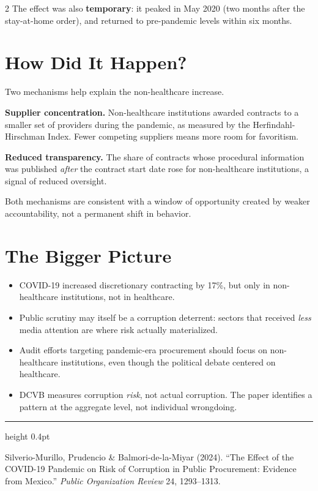 \documentclass[9pt]{article}
\begin{document}
\begin{multicols}{2}
The effect was also \textbf{temporary}: it peaked in May 2020
(two months after the stay-at-home order), and returned to pre-pandemic
levels within six months.

\section{How Did It Happen?}

Two mechanisms help explain the non-healthcare increase.

\textbf{Supplier concentration.} Non-healthcare institutions awarded
contracts to a smaller set of providers during the pandemic, as
measured by the Herfindahl-Hirschman Index. Fewer competing suppliers
means more room for favoritism.

\textbf{Reduced transparency.} The share of contracts whose procedural
information was published \textit{after} the contract start date rose
for non-healthcare institutions, a signal of reduced oversight.

Both mechanisms are consistent with a window of opportunity created
by weaker accountability, not a permanent shift in behavior.

\section{The Bigger Picture}

\begin{itemize}
  \item COVID-19 increased discretionary contracting by 17\%, but only
        in non-healthcare institutions, not in healthcare.
  \item Public scrutiny may itself be a corruption deterrent:
        sectors that received \textit{less} media attention are where
        risk actually materialized.
  \item Audit efforts targeting pandemic-era procurement should focus
        on non-healthcare institutions, even though the political
        debate centered on healthcare.
  \item DCVB measures corruption \textit{risk}, not actual corruption.
        The paper identifies a pattern at the aggregate level, not
        individual wrongdoing.
\end{itemize}

\end{multicols}

\vspace{0.2em}
{\color{navyblue}\hrule height 0.4pt}
\vspace{0.2em}
{\small\color{medgray}\centering
  Silverio-Murillo, Prudencio \& Balmori-de-la-Miyar (2024).
  ``The Effect of the COVID-19 Pandemic on Risk of Corruption in Public Procurement: Evidence from Mexico.''
  \textit{Public Organization Review} 24, 1293--1313.\par
}
\end{document}
